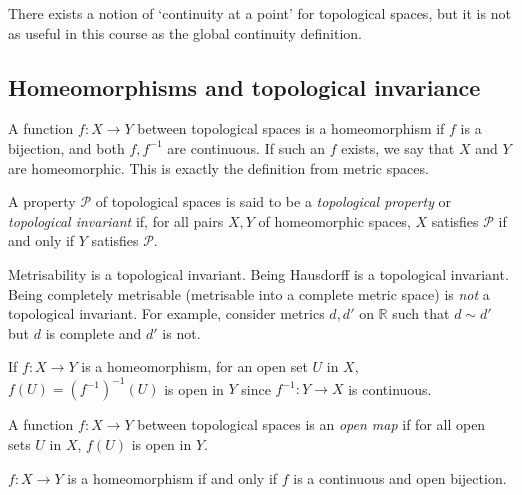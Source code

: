 \begin{remark}
	There exists a notion of `continuity at a point' for topological spaces, but it is not as useful in this course as the global continuity definition.
\end{remark}

\subsection{Homeomorphisms and topological invariance}
\begin{definition}
	A function \( f \colon X \to Y \) between topological spaces is a homeomorphism if \( f \) is a bijection, and both \( f, f^{-1} \) are continuous.
	If such an \( f \) exists, we say that \( X \) and \( Y \) are homeomorphic.
	This is exactly the definition from metric spaces.
\end{definition}
\begin{definition}
	A property \( \mathcal P \) of topological spaces is said to be a \textit{topological property} or \textit{topological invariant} if, for all pairs \( X, Y \) of homeomorphic spaces, \( X \) satisfies \( \mathcal P \) if and only if \( Y \) satisfies \( \mathcal P \).
\end{definition}
\begin{example}
	Metrisability is a topological invariant.
	Being Hausdorff is a topological invariant.
	Being completely metrisable (metrisable into a complete metric space) is \textit{not} a topological invariant.
	For example, consider metrics \( d, d' \) on \( \mathbb R \) such that \( d \sim d' \) but \( d \) is complete and \( d' \) is not.
\end{example}
\begin{remark}
	If \( f \colon X \to Y \) is a homeomorphism, for an open set \( U \) in \( X \), \( f(U) = (f^{-1})^{-1}(U) \) is open in \( Y \) since \( f^{-1} \colon Y \to X \) is continuous.
\end{remark}
\begin{definition}
	A function \( f \colon X \to Y \) between topological spaces is an \textit{open map} if for all open sets \( U \) in \( X \), \( f(U) \) is open in \( Y \).
\end{definition}
\begin{remark}
	\( f \colon X \to Y \) is a homeomorphism if and only if \( f \) is a continuous and open bijection.
\end{remark}

